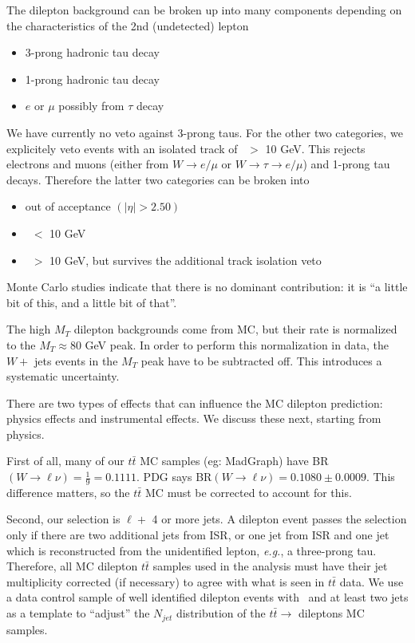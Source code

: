The dilepton background can be broken up into many components depending
on the characteristics of the 2nd (undetected) lepton
\begin{itemize}
\item 3-prong hadronic tau decay
\item 1-prong hadronic tau decay 
\item $e$ or $\mu$ possibly from $\tau$ decay
\end{itemize}
We have currently no veto against 3-prong taus.  For the other two categories, we explicitely 
veto events %
with an isolated track of \pt\ $>$ 10 GeV.  This rejects electrons and muons (either from $W\to e/\mu$ or
$W\to \tau\to e/\mu$) and 1-prong tau decays.
Therefore the latter two categories can be broken into 
\begin{itemize}
\item out of acceptance $(|\eta| > 2.50)$
\item \pt\ $<$ 10 GeV
\item \pt\ $>$ 10 GeV, but survives the additional track isolation veto
\end{itemize}
Monte Carlo studies indicate that there is no dominant contribution: it is ``a little bit of this,
and a little bit of that''.

The high $M_T$ dilepton backgrounds come from MC, but their rate is normalized to the 
$M_T \approx 80$ GeV peak.  In order to perform this normalization in data, the $W +$ jets
events in the $M_T$ peak have to be subtracted off.  This introduces a systematic uncertainty.

There are two types of effects that can influence the MC dilepton prediction: physics effects 
and instrumental effects.  We discuss these next, starting from physics.

First of all, many of our $t\bar{t}$ MC samples (eg: MadGraph) have
 BR$(W \to \ell \nu)=\frac{1}{9} = 0.1111$.
PDG says BR$(W \to \ell \nu) = 0.1080 \pm 0.0009$.  This difference matters, so the $t\bar{t}$ MC 
must be corrected to account for this.

Second, our selection is $\ell +$ 4 or more jets.  A dilepton event passes the selection only if there are 
two additional jets from ISR, or one jet from ISR and one jet which is reconstructed from the 
unidentified lepton, {\it e.g.}, a three-prong tau.  Therefore, all MC dilepton $t\bar{t}$ samples used
in the analysis must have their jet multiplicity corrected (if necessary) to agree with what is 
seen in $t\bar{t}$ data.  We use a data control sample of well identified dilepton events with
\met\ and at least two jets as a template to ``adjust'' the $N_{jet}$ distribution of the $t\bar{t} \to$
dileptons MC samples.

